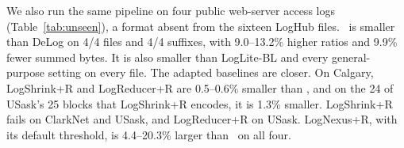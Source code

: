 We also run the same pipeline on four public web-server access logs (Table~\ref{tab:unseen}), a format absent from the sixteen LogHub files. \tool\ is smaller than DeLog on 4/4 files and 4/4 suffixes, with 9.0--13.2\% higher ratios and 9.9\% fewer summed bytes. It is also smaller than LogLite-BL and every general-purpose setting on every file. The adapted baselines are closer. On Calgary, LogShrink+R and LogReducer+R are 0.5--0.6\% smaller than \tool, and on the 24 of USask's 25 blocks that LogShrink+R encodes, it is 1.3\% smaller. LogShrink+R fails on ClarkNet and USask, and LogReducer+R on USask. LogNexus+R, with its default threshold, is 4.4--20.3\% larger than \tool\ on all four.
